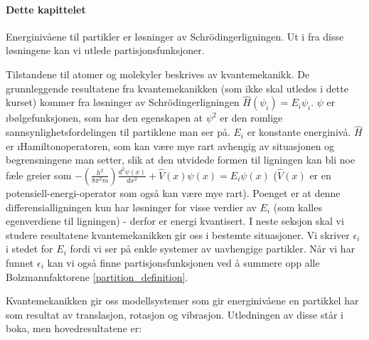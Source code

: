 \paragraph{Dette kapittelet}
Energinivåene til partikler er løsninger av Schrödingerligningen. Ut i fra disse løsningene kan vi utlede partisjonsfunksjoner.

Tilstandene til atomer og molekyler beskrives av kvantemekanikk. De grunnleggende resultatene fra kvantemekanikken (som ikke skal utledes i dette kurset) kommer fra løsninger av Schrödingerligningen $\hat{H}(\psi_i)=E_i\psi_i$. $\psi$ er \i{bølgefunksjonen}, som har den egenskapen at $\psi^2$ er den romlige sannsynlighetsfordelingen til partiklene man ser på. $E_i$ er konstante energinivå. $\hat{H}$ er \i{Hamiltonoperatoren}, som kan være mye rart avhengig av situasjonen og begrensningene man setter, slik at den utvidede formen til ligningen kan bli noe fæle greier som $-\left(\frac{h^2}{8\pi^2m}\right)\frac{d^2\psi(x)}{dx^2}+\hat{V}(x)\psi(x)=E_i\psi(x)$ ($\hat{V}(x)$ er en potensiell-energi-operator som også kan være mye rart). Poenget er at denne differensialligningen kun har løsninger for visse verdier av $E_i$ (som kalles egenverdiene til ligningen) - derfor er energi kvantisert. I neste seksjon skal vi studere resultatene kvantemekanikken gir oss i bestemte situasjoner. Vi skriver $\epsilon_i$ i stedet for $E_i$ fordi vi ser på enkle systemer av uavhengige partikler. Når vi har funnet $\epsilon_i$ kan vi også finne partisjonsfunksjonen ved å summere opp alle Bolzmannfaktorene \eqref{partition_definition}.

Kvantemekanikken gir oss modellsystemer som gir energinivåene en partikkel har som resultat av translasjon, rotasjon og vibrasjon. Utledningen av disse står i boka, men hovedresultatene er:

